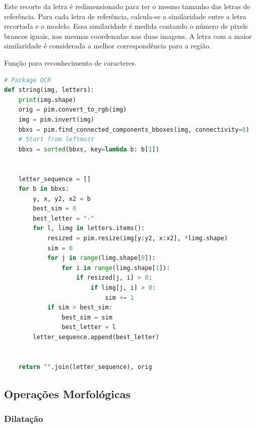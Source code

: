 \documentclass[english, 
               brazil, 
               bsc] %
               {dcomp-abntex2}
\begin{document}
Este recorte da letra é redimensionado para ter o mesmo tamanho das letras de referência. Para cada letra de referência, calcula-se a similaridade entre a letra recortada e o modelo. Essa similaridade é medida contando o número de pixels brancos iguais, nas mesmas coordenadas nas duas imagens. A letra com a maior similaridade é considerada a melhor correspondência para a região.




\begin{codigo}[h]
  \caption{\small Função para reconhecimento de caracteres.}
 \label{cod-ocr}
\begin{lstlisting}[language=python]
# Package OCR
def string(img, letters):
    print(img.shape)
    orig = pim.convert_to_rgb(img)
    img = pim.invert(img)
    bbxs = pim.find_connected_components_bboxes(img, connectivity=8)
    # Start from leftmost
    bbxs = sorted(bbxs, key=lambda b: b[1])


    letter_sequence = []
    for b in bbxs:
        y, x, y2, x2 = b
        best_sim = 0
        best_letter = "-"
        for l, limg in letters.items():
            resized = pim.resize(img[y:y2, x:x2], *limg.shape)
            sim = 0
            for j in range(limg.shape[0]):
                for i in range(limg.shape[1]):
                    if resized[j, i] > 0:
                        if limg[j, i] > 0:
                            sim += 1
            if sim > best_sim:
                best_sim = sim
                best_letter = l
        letter_sequence.append(best_letter)


    return "".join(letter_sequence), orig
\end{lstlisting}
\end{codigo}












\subsection{Operações Morfológicas} \label{sec-morph}
\subsubsection{Dilatação}
\end{document}

